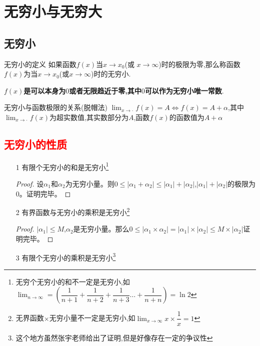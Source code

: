 \documentclass[10pt, a4paper, oneside, UTF8]{ctexbook}
\begin{document}
\begin{sloppypar}
    \section{无穷小与无穷大}
    \subsection{无穷小}
    \begin{defn}{无穷小的定义}{}
        如果函数$f(x)$当$x\to x_0$(或 $x\to\infty$)时的极限为零,那么称函数$f(x)$为当$x\to x_0$(或$x\to\infty$)时的无穷小.
    \end{defn}
    \textbf{$f(x)$是可以本身为$0$或者无限趋近于零,其中$0$可以作为无穷小唯一常数}.
    \begin{criterion}{无穷小与函数极限的关系(脱帽法)}{}
        $\lim_{x\to\cdot}f(x)=A\Leftrightarrow f(x)=A+\alpha$,其中$\lim_{x\to\cdot}f(x)$为超实数值,其实数部分为$A$,函数$f(x)$的函数值为$A+\alpha$\label{wqx1}
    \end{criterion}
    \subsection{\textcolor{red}{无穷小的性质}}
    \begin{itemize}
        \item[1] 有限个无穷小的和是无穷小\footnote{无穷个无穷小的和不一定是无穷小,如$\lim_{n \to \infty}=(\dfrac{1}{n+1}+\dfrac{1}{n+2}+\dfrac{1}{n+3}\dots +\dfrac{1}{n+n})=\ln 2$}
            \begin{proof}
                设$\alpha_1$和$\alpha_2$为无穷小量。则$0 \leqslant |\alpha_1+\alpha_2|\leqslant |\alpha_1|+|\alpha_2|$,$|\alpha_1|+|\alpha_2|$的极限为0。证明完毕。
            \end{proof}
        \item[2] 有界函数与无穷小的乘积是无穷小\footnote{无界函数$\times$无穷小量不一定是无穷小,如$\lim_{x \to \infty}x \times \dfrac{1}{x}=1$}
            \begin{proof}
                $|\alpha _1|\leqslant M$,$\alpha_2$是无穷小量。那么$0\leqslant|\alpha_1 \times \alpha_2|=|\alpha_1|\times |\alpha_2|\leqslant M \times |\alpha_2|$证明完毕。
            \end{proof}
        \item[3] 有限个无穷小的乘积是无穷小\footnote{这个地方虽然张宇老师给出了证明,但是好像存在一定的争议性}
    \end{itemize}

\end{sloppypar}
\end{document}
